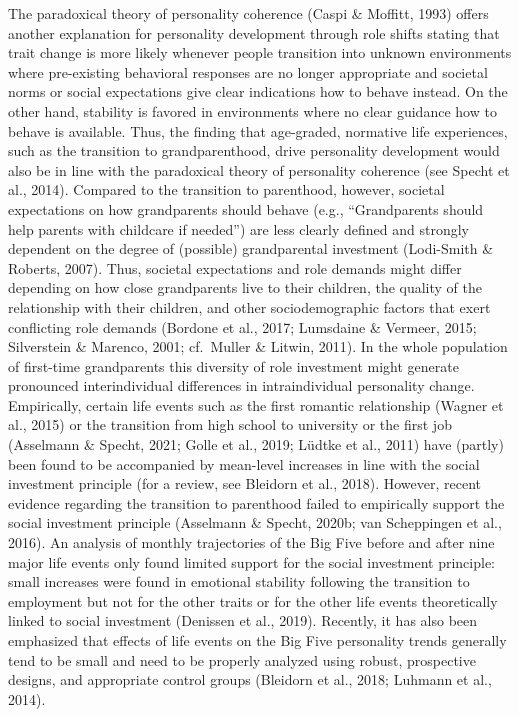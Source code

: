 \documentclass[
  english,
  man, noextraspace]{apa7}
\begin{document}
The paradoxical theory of personality coherence (Caspi \& Moffitt, 1993) offers another explanation for personality development through role shifts stating that trait change is more likely whenever people transition into unknown environments where pre-existing behavioral responses are no longer appropriate and societal norms or social expectations give clear indications how to behave instead. On the other hand, stability is favored in environments where no clear guidance how to behave is available. Thus, the finding that age-graded, normative life experiences, such as the transition to grandparenthood, drive personality development would also be in line with the paradoxical theory of personality coherence (see Specht et al., 2014). Compared to the transition to parenthood, however, societal expectations on how grandparents should behave (e.g., \enquote{Grandparents should help parents with childcare if needed}) are less clearly defined and strongly dependent on the degree of (possible) grandparental investment (Lodi-Smith \& Roberts, 2007). Thus, societal expectations and role demands might differ depending on how close grandparents live to their children, the quality of the relationship with their children, and other sociodemographic factors that exert conflicting role demands (Bordone et al., 2017; Lumsdaine \& Vermeer, 2015; Silverstein \& Marenco, 2001; cf.~Muller \& Litwin, 2011). In the whole population of first-time grandparents this diversity of role investment might generate pronounced interindividual differences in intraindividual personality change.\\
Empirically, certain life events such as the first romantic relationship (Wagner et al., 2015) or the transition from high school to university or the first job (Asselmann \& Specht, 2021; Golle et al., 2019; Lüdtke et al., 2011) have (partly) been found to be accompanied by mean-level increases in line with the social investment principle (for a review, see Bleidorn et al., 2018). However, recent evidence regarding the transition to parenthood failed to empirically support the social investment principle (Asselmann \& Specht, 2020b; van Scheppingen et al., 2016). An analysis of monthly trajectories of the Big Five before and after nine major life events only found limited support for the social investment principle: small increases were found in emotional stability following the transition to employment but not for the other traits or for the other life events theoretically linked to social investment (Denissen et al., 2019). Recently, it has also been emphasized that effects of life events on the Big Five personality trends generally tend to be small and need to be properly analyzed using robust, prospective designs, and appropriate control groups (Bleidorn et al., 2018; Luhmann et al., 2014).\\
\end{document}
